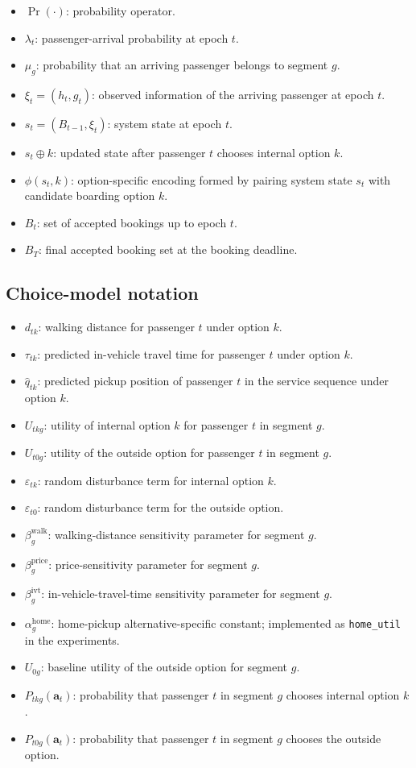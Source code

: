 \documentclass[preprint,12pt,authoryear]{elsarticle}
\begin{document}
\begin{itemize}
\item $\Pr(\cdot)$: probability operator.
\item $\lambda_t$: passenger-arrival probability at epoch $t$.
\item $\mu_g$: probability that an arriving passenger belongs to segment $g$.
\item $\xi_t=(h_t,g_t)$: observed information of the arriving passenger at epoch $t$.
\item $s_t=(B_{t-1},\xi_t)$: system state at epoch $t$.
\item $s_t\oplus k$: updated state after passenger $t$ chooses internal option $k$.
\item $\phi(s_t,k)$: option-specific encoding formed by pairing system state $s_t$ with candidate boarding option $k$.
\item $B_t$: set of accepted bookings up to epoch $t$.
\item $B_T$: final accepted booking set at the booking deadline.
\end{itemize}

\subsection{Choice-model notation}

\begin{itemize}
\item $d_{tk}$: walking distance for passenger $t$ under option $k$.
\item $\tau_{tk}$: predicted in-vehicle travel time for passenger $t$ under option $k$.
\item $\hat{q}_{tk}$: predicted pickup position of passenger $t$ in the service sequence under option $k$.
\item $U_{tkg}$: utility of internal option $k$ for passenger $t$ in segment $g$.
\item $U_{t0g}$: utility of the outside option for passenger $t$ in segment $g$.
\item $\varepsilon_{tk}$: random disturbance term for internal option $k$.
\item $\varepsilon_{t0}$: random disturbance term for the outside option.
\item $\beta_g^{\mathrm{walk}}$: walking-distance sensitivity parameter for segment $g$.
\item $\beta_g^{\mathrm{price}}$: price-sensitivity parameter for segment $g$.
\item $\beta_g^{\mathrm{ivt}}$: in-vehicle-travel-time sensitivity parameter for segment $g$.
\item $\alpha_g^{\mathrm{home}}$: home-pickup alternative-specific constant; implemented as \texttt{home\_util} in the experiments.
\item $U_{0g}$: baseline utility of the outside option for segment $g$.
\item $P_{tkg}(\mathbf{a}_t)$: probability that passenger $t$ in segment $g$ chooses internal option $k$.
\item $P_{t0g}(\mathbf{a}_t)$: probability that passenger $t$ in segment $g$ chooses the outside option.
\end{itemize}
\end{document}
